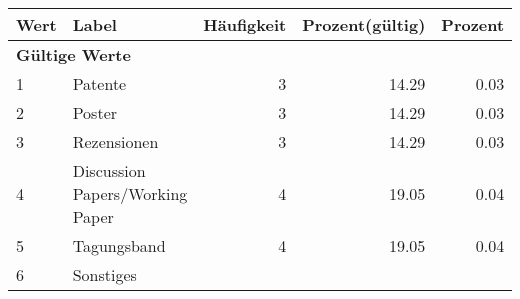      \begin{longtable}{lXrrr}
     \toprule
     \textbf{Wert} & \textbf{Label} & \textbf{Häufigkeit} & \textbf{Prozent(gültig)} & \textbf{Prozent} \\
     \endhead
     \midrule
     \multicolumn{5}{l}{\textbf{Gültige Werte}}\\

     1 &
     \multicolumn{1}{X}{ Patente   } &


       \num{3} &
       \num[round-mode=places,round-precision=2]{14,29} &
         \num[round-mode=places,round-precision=2]{0,03} \\

     2 &
     \multicolumn{1}{X}{ Poster   } &


       \num{3} &
       \num[round-mode=places,round-precision=2]{14,29} &
         \num[round-mode=places,round-precision=2]{0,03} \\

     3 &
     \multicolumn{1}{X}{ Rezensionen   } &


       \num{3} &
       \num[round-mode=places,round-precision=2]{14,29} &
         \num[round-mode=places,round-precision=2]{0,03} \\

     4 &
     \multicolumn{1}{X}{ Discussion Papers/Working Paper   } &


       \num{4} &
       \num[round-mode=places,round-precision=2]{19,05} &
         \num[round-mode=places,round-precision=2]{0,04} \\

     5 &
     \multicolumn{1}{X}{ Tagungsband   } &


       \num{4} &
       \num[round-mode=places,round-precision=2]{19,05} &
         \num[round-mode=places,round-precision=2]{0,04} \\

     6 &
     \multicolumn{1}{X}{ Sonstiges   } &



\end{longtable}
